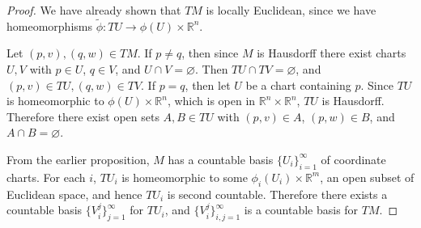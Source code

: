 \begin{proof}
We have already shown that $TM$ is locally Euclidean, since we have
homeomorphisms $\tilde{\phi}: TU \to \phi(U) \times \mathbb{R}^n$.

Let $(p, v), (q, w) \in TM$. If $p \neq q$, then since $M$ is
Hausdorff there exist charts $U, V$ with $p \in U$, $q \in V$, and
$U \cap V = \varnothing$. Then $TU \cap TV = \varnothing$, and
$(p, v) \in TU, (q, w) \in TV$. If $p = q$, then let $U$ be a chart
containing $p$. Since $TU$ is homeomorphic to
$\phi(U) \times \mathbb{R}^n$, which is open in
$\mathbb{R}^n \times \mathbb{R}^n$, $TU$ is Hausdorff. Therefore there
exist open sets $A, B \in TU$ with $(p, v) \in A$, $(p, w) \in B$, and
$A \cap B = \varnothing$.

From the earlier proposition, $M$ has a countable basis $\{ U_i \}_{i=1}^\infty$ of
coordinate charts. For each $i$, $TU_i$ is homeomorphic to some
$\phi_i(U_i) \times \mathbb{R}^m$, an open subset of Euclidean space,
and hence
$TU_i$ is second countable. Therefore there exists a countable basis
$\{ V_i^j \}_{j=1}^\infty$ for $TU_i$, and $\{V_i^j\}_{i,j =
  1}^\infty$ is a countable basis for $TM$.
\end{proof}
